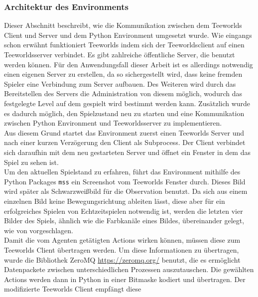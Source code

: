 \documentclass[11pt]{scrartcl}
\begin{document}
\subsubsection{Architektur des Environments} %
\label{sec:architecture-env}
Dieser Abschnitt beschreibt, wie die Kommunikation zwischen dem Teeworlds Client und
Server und dem Python Environment umgesetzt wurde. Wie eingangs schon erwähnt funktioniert
Teeworlds indem sich der Teeworldsclient auf einen Teeworldsserver verbindet. Es gibt
zahlreiche öffentliche Server, die benutzt werden können. Für den Anwendungsfall dieser
Arbeit ist es allerdings notwendig einen eigenen Server zu erstellen, da so sichergestellt
wird, dass keine fremden Spieler eine Verbindung zum Server aufbauen. Des Weiteren wird durch 
das Bereitstellen des Servers die Administration von diesem möglich, wodurch das festgelegte
Level auf dem gespielt wird bestimmt werden kann. Zusätzlich wurde es dadurch möglich,
den Spielzustand neu zu starten und eine Kommunikation zwischen Python Environment und 
Teeworldsserver zu implementieren.\\
Aus diesem Grund startet das Environment zuerst einen Teeworlds Server und nach einer
kurzen Verzögerung den Client als Subprocess. Der Client verbindet sich daraufhin mit dem
neu gestarteten Server und öffnet ein Fenster in dem das Spiel zu sehen ist.\\
Um den aktuellen Spielstand zu erfahren, führt das Environment mithilfe des Python
Packages \lstinline!mss! ein Screenshot vom Teeworlds Fenster durch. Dieses Bild wird
später als Schwarzweißbild für die Observation benutzt. Da sich aus einem einzelnen Bild
keine Bewegungsrichtung ableiten lässt, diese aber für ein erfolgreiches Spielen von
Echtzeitspielen notwendig ist, werden die letzten vier Bilder des Spiels, ähnlich wie die
Farbkanäle eines Bildes, übereinander gelegt, wie von \cite[~S.206]{L2018} %
vorgeschlagen.\\ %
Damit die vom Agenten getätigten Actions wirken können, müssen diese zum Teeworlds Client
übertragen werden. Um diese Informationen zu übertragen, wurde die Bibliothek ZeroMQ
\url{https://zeromq.org/} benutzt, die es ermöglicht Datenpackete zwischen
unterschiedlichen Prozessen auszutauschen. Die gewählten Actions werden dann in Python
in einer Bitmaske kodiert und übertragen. Der modifizierte Teeworlds Client empfängt diese
\end{document}
